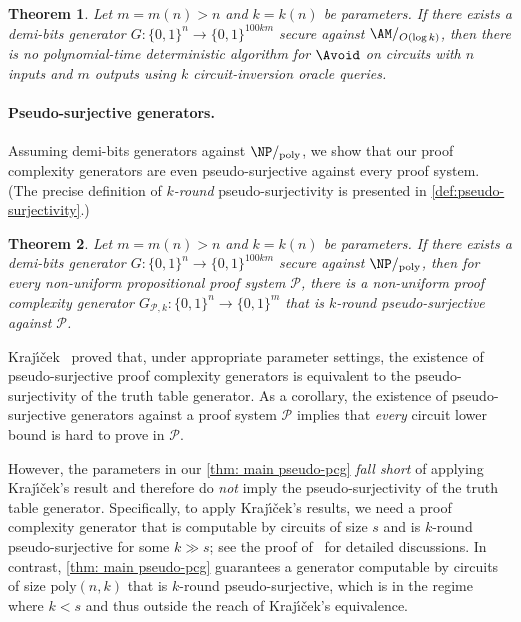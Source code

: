 \documentclass[10pt,a4paper]{article}
\newtheorem{theorem}{Theorem}[section]
\theoremstyle{definition}
\theoremstyle{remark}
\renewcommand{\poly}{\mathrm{poly}}
\newcommand{\calP}{\mathcal{P}}
\newcommand{\Krajicek}{Kraj\'{\i}\v{c}ek\xspace}
\begin{document}
\begin{theorem}\label{thm: main no-avoid^O(1)}
    Let $m = m(n) > n$ and $k = k(n)$ be parameters. If there exists a demi-bits generator $G: \{0,1\}^n \to \{0,1\}^{100km}$ secure against $\AM/_{O(\log k)}$, then there is no polynomial-time deterministic algorithm for $\Avoid$ on circuits with $n$ inputs and $m$ outputs using $k$ circuit-inversion oracle queries.
\end{theorem}


\paragraph{Pseudo-surjective generators.} Assuming demi-bits generators against $\NP/_{\poly}$, we show that our proof complexity generators are even pseudo-surjective against every proof system. (The precise definition of \emph{$k$-round} pseudo-surjectivity is presented in \autoref{def:pseudo-surjectivity}.)

\begin{theorem}\label{thm: main pseudo-pcg}
    Let $m = m(n) > n$ and $k = k(n)$ be parameters. If there exists a demi-bits generator $G:\{0,1\}^n\to\{0,1\}^{100km}$ secure against $\NP/_{\poly}$, then for every non-uniform propositional proof system $\calP$, there is a non-uniform proof complexity generator $G_{\calP, k}: \{0, 1\}^n \to \{0, 1\}^m$ that is $k$-round pseudo-surjective against $\calP$.
\end{theorem}





\Krajicek~\cite{Krajicek04} proved that, under appropriate parameter settings, the existence of pseudo-surjective proof complexity generators is equivalent to the pseudo-surjectivity of the truth table generator. As a corollary, the existence of pseudo-surjective generators against a proof system $\calP$ implies that \emph{every} circuit lower bound is hard to prove in $\calP$. 

However, the parameters in our \autoref{thm: main pseudo-pcg} \emph{fall short} of applying \Krajicek's result and therefore do \emph{not} imply the pseudo-surjectivity of the truth table generator. Specifically, to apply \Krajicek's results, we need a proof complexity generator that is computable by circuits of size $s$ and is $k$-round pseudo-surjective for some $k \gg s$; see the proof of~\cite[Theorem 4.2]{Krajicek04} for detailed discussions. In contrast, \autoref{thm: main pseudo-pcg} guarantees a generator computable by circuits of size $\poly(n, k)$ that is $k$-round pseudo-surjective, which is in the regime where $k<s$ and thus outside the reach of \Krajicek's equivalence.
\end{document}
